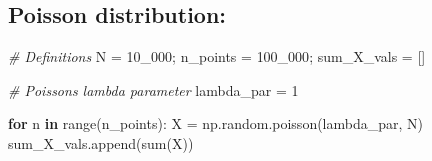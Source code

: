 \documentclass[
]{article}
\newenvironment{Shaded}{}{}
\newcommand{\BuiltInTok}[1]{\textcolor[rgb]{0.00,0.50,0.00}{#1}}
\newcommand{\CommentTok}[1]{\textcolor[rgb]{0.38,0.63,0.69}{\textit{#1}}}
\newcommand{\ControlFlowTok}[1]{\textcolor[rgb]{0.00,0.44,0.13}{\textbf{#1}}}
\newcommand{\DecValTok}[1]{\textcolor[rgb]{0.25,0.63,0.44}{#1}}
\newcommand{\KeywordTok}[1]{\textcolor[rgb]{0.00,0.44,0.13}{\textbf{#1}}}
\newcommand{\NormalTok}[1]{#1}
\newcommand{\OperatorTok}[1]{\textcolor[rgb]{0.40,0.40,0.40}{#1}}
\begin{document}
\hypertarget{poisson-distribution}{%
\subsection{Poisson distribution:}\label{poisson-distribution}}

\begin{Shaded}
\begin{Highlighting}[]
\CommentTok{\# Definitions}
\NormalTok{N }\OperatorTok{=} \DecValTok{10\_000}\OperatorTok{;}\NormalTok{ n\_points }\OperatorTok{=} \DecValTok{100\_000}\OperatorTok{;}\NormalTok{ sum\_X\_vals }\OperatorTok{=}\NormalTok{ []}

\CommentTok{\# Poisson\textquotesingle{}s lambda parameter}
\NormalTok{lambda\_par }\OperatorTok{=} \DecValTok{1}

\ControlFlowTok{for}\NormalTok{ n }\KeywordTok{in} \BuiltInTok{range}\NormalTok{(n\_points):}
\NormalTok{    X }\OperatorTok{=}\NormalTok{ np.random.poisson(lambda\_par, N)}
\NormalTok{    sum\_X\_vals.append(}\BuiltInTok{sum}\NormalTok{(X))}
\end{Highlighting}
\end{Shaded}
\end{document}
